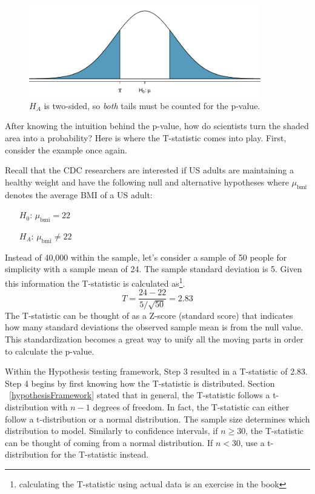 \begin{figure}
   \centering
   \includegraphics[width=0.9\textwidth]{ch_inference_foundations_oi_biostat/figures/2ndSchSleepHTExample/2ndSchSleepHTExample}
   \caption{$H_A$ is two-sided, so \emph{both} tails must be counted for the p-value.}
   \label{2ndSchSleepHTExample}
\end{figure}

After knowing the intuition behind the p-value, how do scientists turn the shaded area into a probability? Here is where the T-statistic comes into play. First, consider the  example once again.

Recall that the CDC researchers are interested if US adults are maintaining a healthy weight and have the following null and alternative hypotheses where $\mu_{\mathrm{bmi}}$ denotes the average BMI of a US adult:

 \begin{itemize}
\setlength{\itemsep}{0mm}
\item[$H_0$:] $\mu_{\mathrm{bmi}}=22$
\item[$H_A$:] $\mu_{\mathrm{bmi}} \neq 22$ 
\end{itemize}

Instead of 40,000 within the  sample, let's consider a sample of 50 people for simplicity with a sample mean of 24. The sample standard deviation is 5. Given this information the T-statistic is calculated as\footnote{calculating the T-statistic using actual data is an exercise in the book}. \[T=\frac{24-22}{5/\sqrt{50}}= 2.83\] The T-statistic can be thought of as a Z-score (standard score) that indicates how many standard deviations the observed sample mean is from the null value. This standardization becomes a great way to unify all the moving parts in order to calculate the p-value. 

Within the Hypothesis testing framework, Step 3 resulted in a T-statistic of 2.83. Step 4 begins by first knowing how the T-statistic is distributed. Section ~\ref{hypothesisFramework} stated that in general, the T-statistic follows a t-distribution with $n-1$ degrees of freedom. In fact, the T-statistic can either follow a t-distribution or a normal distribution. The sample size determines which distribution to model. Similarly to confidence intervals, if $n \geq 30$, the T-statistic can be thought of coming from a normal distribution. If $n < 30$, use a t-distribution for the T-statistic instead.

